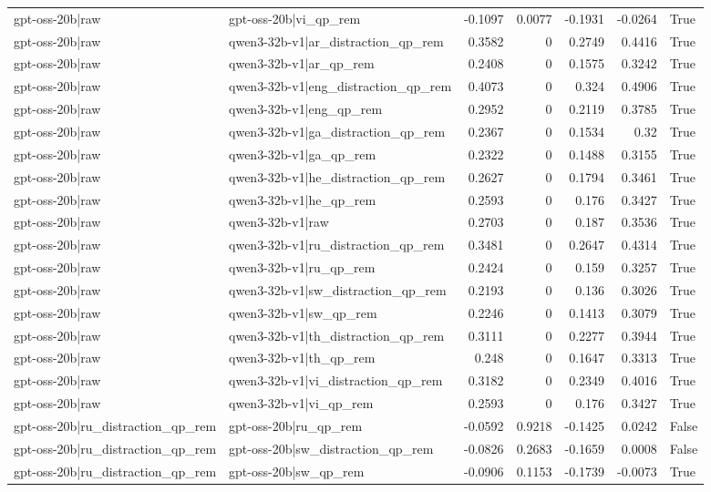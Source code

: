 \begin{table}
\begin{tabular}{l l r r r r l}
gpt-oss-20b|raw & gpt-oss-20b|vi_qp_rem & -0.1097 & 0.0077 & -0.1931 & -0.0264 & True \\
gpt-oss-20b|raw & qwen3-32b-v1|ar_distraction_qp_rem & 0.3582 & 0 & 0.2749 & 0.4416 & True \\
gpt-oss-20b|raw & qwen3-32b-v1|ar_qp_rem & 0.2408 & 0 & 0.1575 & 0.3242 & True \\
gpt-oss-20b|raw & qwen3-32b-v1|eng_distraction_qp_rem & 0.4073 & 0 & 0.324 & 0.4906 & True \\
gpt-oss-20b|raw & qwen3-32b-v1|eng_qp_rem & 0.2952 & 0 & 0.2119 & 0.3785 & True \\
gpt-oss-20b|raw & qwen3-32b-v1|ga_distraction_qp_rem & 0.2367 & 0 & 0.1534 & 0.32 & True \\
gpt-oss-20b|raw & qwen3-32b-v1|ga_qp_rem & 0.2322 & 0 & 0.1488 & 0.3155 & True \\
gpt-oss-20b|raw & qwen3-32b-v1|he_distraction_qp_rem & 0.2627 & 0 & 0.1794 & 0.3461 & True \\
gpt-oss-20b|raw & qwen3-32b-v1|he_qp_rem & 0.2593 & 0 & 0.176 & 0.3427 & True \\
gpt-oss-20b|raw & qwen3-32b-v1|raw & 0.2703 & 0 & 0.187 & 0.3536 & True \\
gpt-oss-20b|raw & qwen3-32b-v1|ru_distraction_qp_rem & 0.3481 & 0 & 0.2647 & 0.4314 & True \\
gpt-oss-20b|raw & qwen3-32b-v1|ru_qp_rem & 0.2424 & 0 & 0.159 & 0.3257 & True \\
gpt-oss-20b|raw & qwen3-32b-v1|sw_distraction_qp_rem & 0.2193 & 0 & 0.136 & 0.3026 & True \\
gpt-oss-20b|raw & qwen3-32b-v1|sw_qp_rem & 0.2246 & 0 & 0.1413 & 0.3079 & True \\
gpt-oss-20b|raw & qwen3-32b-v1|th_distraction_qp_rem & 0.3111 & 0 & 0.2277 & 0.3944 & True \\
gpt-oss-20b|raw & qwen3-32b-v1|th_qp_rem & 0.248 & 0 & 0.1647 & 0.3313 & True \\
gpt-oss-20b|raw & qwen3-32b-v1|vi_distraction_qp_rem & 0.3182 & 0 & 0.2349 & 0.4016 & True \\
gpt-oss-20b|raw & qwen3-32b-v1|vi_qp_rem & 0.2593 & 0 & 0.176 & 0.3427 & True \\
gpt-oss-20b|ru_distraction_qp_rem & gpt-oss-20b|ru_qp_rem & -0.0592 & 0.9218 & -0.1425 & 0.0242 & False \\
gpt-oss-20b|ru_distraction_qp_rem & gpt-oss-20b|sw_distraction_qp_rem & -0.0826 & 0.2683 & -0.1659 & 0.0008 & False \\
gpt-oss-20b|ru_distraction_qp_rem & gpt-oss-20b|sw_qp_rem & -0.0906 & 0.1153 & -0.1739 & -0.0073 & True \\

\end{tabular}
\end{table}
